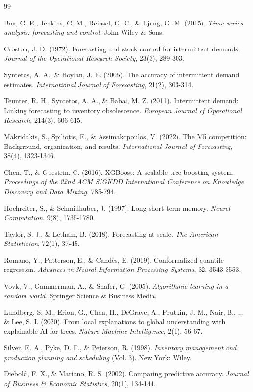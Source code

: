 \documentclass[12pt,a4paper,oneside]{report}
\theoremstyle{definition}
\begin{document}
\newpage
\begin{thebibliography}{99}

Box, G. E., Jenkins, G. M., Reinsel, G. C., \& Ljung, G. M. (2015). \textit{Time series analysis: forecasting and control}. John Wiley \& Sons.

Croston, J. D. (1972). Forecasting and stock control for intermittent demands. \textit{Journal of the Operational Research Society}, 23(3), 289-303.

Syntetos, A. A., \& Boylan, J. E. (2005). The accuracy of intermittent demand estimates. \textit{International Journal of Forecasting}, 21(2), 303-314.

Teunter, R. H., Syntetos, A. A., \& Babai, M. Z. (2011). Intermittent demand: Linking forecasting to inventory obsolescence. \textit{European Journal of Operational Research}, 214(3), 606-615.

Makridakis, S., Spiliotis, E., \& Assimakopoulos, V. (2022). The M5 competition: Background, organization, and results. \textit{International Journal of Forecasting}, 38(4), 1323-1346.

Chen, T., \& Guestrin, C. (2016). XGBoost: A scalable tree boosting system. \textit{Proceedings of the 22nd ACM SIGKDD International Conference on Knowledge Discovery and Data Mining}, 785-794.

Hochreiter, S., \& Schmidhuber, J. (1997). Long short-term memory. \textit{Neural Computation}, 9(8), 1735-1780.

Taylor, S. J., \& Letham, B. (2018). Forecasting at scale. \textit{The American Statistician}, 72(1), 37-45.

Romano, Y., Patterson, E., \& Candès, E. (2019). Conformalized quantile regression. \textit{Advances in Neural Information Processing Systems}, 32, 3543-3553.

Vovk, V., Gammerman, A., \& Shafer, G. (2005). \textit{Algorithmic learning in a random world}. Springer Science \& Business Media.

Lundberg, S. M., Erion, G., Chen, H., DeGrave, A., Prutkin, J. M., Nair, B., ... \& Lee, S. I. (2020). From local explanations to global understanding with explainable AI for trees. \textit{Nature Machine Intelligence}, 2(1), 56-67.

Silver, E. A., Pyke, D. F., \& Peterson, R. (1998). \textit{Inventory management and production planning and scheduling} (Vol. 3). New York: Wiley.

Diebold, F. X., \& Mariano, R. S. (2002). Comparing predictive accuracy. \textit{Journal of Business \& Economic Statistics}, 20(1), 134-144.

\end{thebibliography}
\end{document}
